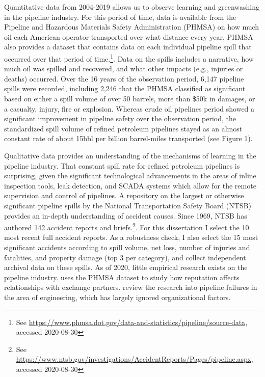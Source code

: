 Quantitative data from 2004-2019 allows us to observe learning and greenwashing in the pipeline industry. For this period of time, data is available from the Pipeline and Hazardous Materials Safety Administration (PHMSA) on how much oil each American operator transported over what distance every year. PHMSA also provides a dataset that contains data on each individual pipeline spill that occurred over that period of time.\footnote{See \url{https://www.phmsa.dot.gov/data-and-statistics/pipeline/source-data}, accessed 2020-08-30}. Data on the spills includes a narrative, how much oil was spilled and recovered, and what other impacts (e.g., injuries or deaths) occurred. Over the 16 years of the observation period, 6,147 pipeline spills were recorded, including 2,246 that the PHMSA classified as significant based on either a spill volume of over 50 barrels, more than \$50k in damages, or a casualty, injury, fire or explosion. Whereas crude oil pipelines period showed a significant improvement in pipeline safety over the observation period, the standardized spill volume of refined petroleum pipelines stayed as an almost constant rate of about 15bbl per billion barrel-miles transported (see Figure 1). 

Qualitative data provides an understanding of the mechanisms of learning in the pipeline industry. That constant spill rate for refined petroleum pipelines is surprising, given the significant technological advancements in the areas of inline inspection tools, leak detection, and SCADA systems which allow for the remote supervision and control of pipelines. A repository on the largest or otherwise significant pipeline spills by the National Transportation Safety Board (NTSB) provides an in-depth understanding of accident causes. Since 1969, NTSB has authored 142 accident reports and briefs.\footnote{See \url{https://www.ntsb.gov/investigations/AccidentReports/Pages/pipeline.aspx}, accessed 2020-08-30}. For this dissertation I select the 10 most recent full accident reports. As a robustness check, I also select the 15 most significant accidents according to spill volume, net loss, number of injuries and fatalities, and property damage (top 3 per category), and collect independent archival data on these spills. As of 2020, little empirical research exists on the pipeline industry. \citet{Park2019} uses the PHMSA dataset to study how reputation affects relationships with exchange partners. \citet{Zakikhani2020} review the research into pipeline failures in the area of engineering, which has largely ignored organizational factors. 

